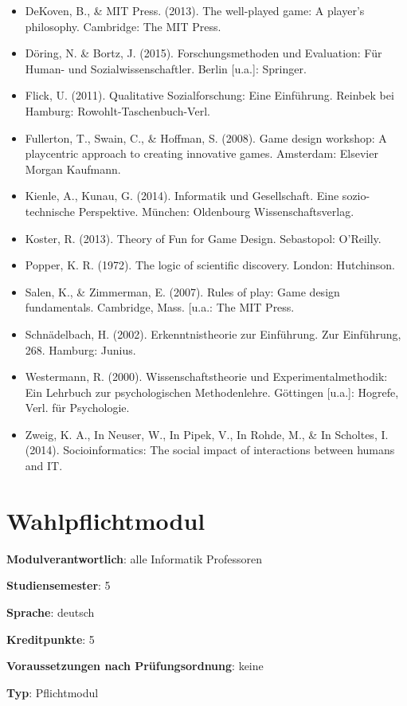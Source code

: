 \begin{itemize}
\tightlist
\item
  DeKoven, B., \& MIT Press. (2013). The well-played game: A player's
  philosophy. Cambridge: The MIT Press.
\item
  Döring, N. \& Bortz, J. (2015). Forschungsmethoden und Evaluation: Für
  Human- und Sozialwissenschaftler. Berlin {[}u.a.{]}: Springer.
\item
  Flick, U. (2011). Qualitative Sozialforschung: Eine Einführung.
  Reinbek bei Hamburg: Rowohlt-Taschenbuch-Verl.
\item
  Fullerton, T., Swain, C., \& Hoffman, S. (2008). Game design workshop:
  A playcentric approach to creating innovative games. Amsterdam:
  Elsevier Morgan Kaufmann.
\item
  Kienle, A., Kunau, G. (2014). Informatik und Gesellschaft. Eine
  sozio-technische Perspektive. München: Oldenbourg Wissenschaftsverlag.
\item
  Koster, R. (2013). Theory of Fun for Game Design. Sebastopol:
  O'Reilly.
\item
  Popper, K. R. (1972). The logic of scientific discovery. London:
  Hutchinson.
\item
  Salen, K., \& Zimmerman, E. (2007). Rules of play: Game design
  fundamentals. Cambridge, Mass. {[}u.a.: The MIT Press.
\item
  Schnädelbach, H. (2002). Erkenntnistheorie zur Einführung. Zur
  Einführung, 268. Hamburg: Junius.
\item
  Westermann, R. (2000). Wissenschaftstheorie und Experimentalmethodik:
  Ein Lehrbuch zur psychologischen Methodenlehre. Göttingen {[}u.a.{]}:
  Hogrefe, Verl. für Psychologie.
\item
  Zweig, K. A., In Neuser, W., In Pipek, V., In Rohde, M., \& In
  Scholtes, I. (2014). Socioinformatics: The social impact of
  interactions between humans and IT.
\end{itemize}

\chapter{Wahlpflichtmodul\label{/mi-2017/modulbeschreibungen-bachelor/BA_WPF}}\label{wahlpflichtmodulpathlabelmi-2017modulbeschreibungen-bachelorbaux5fwpf}

\begin{modulHead}
\textbf{Modulverantwortlich}: alle Informatik
Professoren
\end{modulHead}
\begin{modulHead}
\textbf{Studiensemester}:
5
\end{modulHead}
\begin{modulHead}
\textbf{Sprache}:
deutsch
\end{modulHead}
\begin{modulHead}
\textbf{Kreditpunkte}:
5
\end{modulHead}
\begin{modulHead}
\textbf{Voraussetzungen nach
Prüfungsordnung}: keine
\end{modulHead}
\begin{modulHead}
\textbf{Typ}:
Pflichtmodul
\end{modulHead}


